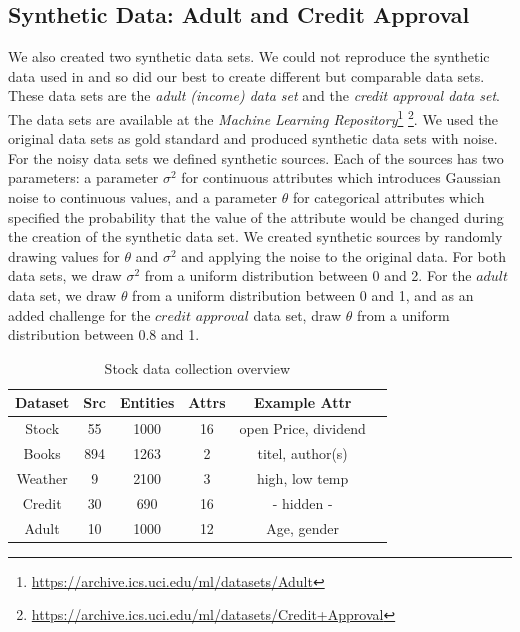 \documentclass{acm_proc_article-sp}
\begin{document}
\subsection{Synthetic Data: Adult and Credit Approval} \label{sec:synth}

We also created two synthetic data sets. We could not reproduce the synthetic data used in \cite{li:resolving} and so did our best to create different but comparable data sets. These data sets are the \emph{adult (income) data set} and the \emph{credit approval data set}. The data sets are available at the \emph{Machine Learning Repository}\footnote{\url{https://archive.ics.uci.edu/ml/datasets/Adult}}
\footnote{\url{https://archive.ics.uci.edu/ml/datasets/Credit+Approval}}. We used the original data sets as gold standard and produced synthetic data sets with noise. For the noisy data sets we defined synthetic sources. Each of the sources has two parameters: a parameter $\sigma^2$ for continuous attributes which introduces Gaussian noise to continuous values, and a parameter $\theta$ for categorical attributes which specified the probability that the value of the attribute would be changed during the creation of the synthetic data set. We created synthetic sources by randomly drawing values for $\theta$ and $\sigma^2$ and applying the noise to the original data. For both data sets, we draw $\sigma^2$ from a uniform distribution between 0 and 2. For the $adult$ data set, we draw $\theta$ from a uniform distribution between 0 and 1, and as an added challenge for the $credit$ $approval$ data set, draw $\theta$ from a uniform distribution between $0.8$ and 1. 

\begin{table}[h] 
    \centering
{%
\begin{tabular}{  | c | c | c | c  | c | c |}		
\hline
\textbf{Dataset} & \textbf{Src} &  \textbf{Entities} & \textbf{Attrs}  & \textbf{Example Attr}  \\
\hline
 Stock & 55 &   1000 & 16 &  open Price, dividend   \\
 Books & 894 &   1263 & 2 &  titel, author(s)   \\
 Weather & 9 &   2100 & 3 &  high, low temp   \\
 Credit & 30 &   690 & 16 &  - hidden -   \\
 Adult & 10 &   1000 & 12 &  Age, gender   \\
\hline
\end{tabular}
}
 \caption{Stock data collection overview}%
    \label{fig:stock}%
\end{table}
\end{document}
